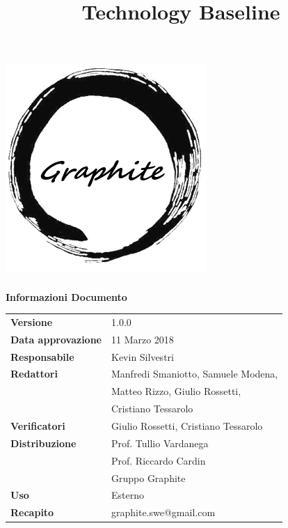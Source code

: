 \documentclass[openany,12pt,a4paper]{report}
\title{Technology Baseline}
\author{}
\newcommand{\versione}{1.0.0}
\begin{document}
	
	\makeatletter
	\begin{titlepage}
		\setlength{\headsep}{0pt}  
		\begin{center}			
			\includegraphics[width=0.5\linewidth]{Logo.png}\\[1em]
			{\huge \bfseries  \@title }\\[10ex]
			\textbf{\Large Informazioni Documento} \\[2em]
			\bgroup
			\def\arraystretch{1.5}
			\begin{tabular}{l|l}
				\textbf{Versione} & \versione{} \\
				\textbf{Data approvazione} & 11 Marzo 2018 \\
				\textbf{Responsabile} & Kevin Silvestri \\
				\textbf{Redattori} & Manfredi Smaniotto, Samuele Modena,\\
				& Matteo Rizzo, Giulio Rossetti, \\
				& Cristiano Tessarolo \\
				\textbf{Verificatori} & Giulio Rossetti, Cristiano Tessarolo \\
				\textbf{Distribuzione} & Prof. Tullio Vardanega \\
				& Prof. Riccardo Cardin \\
				& Gruppo Graphite \\
				\textbf{Uso} & Esterno \\
				\textbf{Recapito} & graphite.swe@gmail.com \\
			\end{tabular}
			\egroup
		\end{center}
	\end{titlepage}
	\makeatother
	
	\thispagestyle{empty}
	\newpage
	
	\tableofcontents
	\listoffigures
	\listoftables
	
	
	
	
	

	
\end{document}
